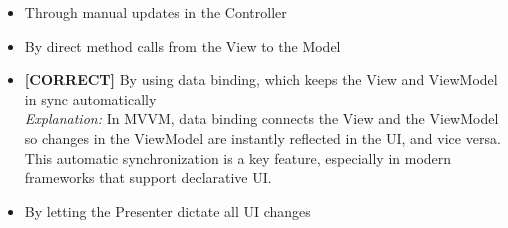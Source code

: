 \begin{itemize}
 \item Through manual updates in the Controller
 \item By direct method calls from the View to the Model
 \item \textbf{[CORRECT]} By using data binding, which keeps the View and ViewModel in sync automatically
\\[0.1cm]
\textit{Explanation:} 
In MVVM, data binding connects the View and the ViewModel so changes in the ViewModel are instantly reflected in the UI, and vice versa. This automatic synchronization is a key feature, especially in modern frameworks that support declarative UI.
 \item By letting the Presenter dictate all UI changes
\end{itemize}



